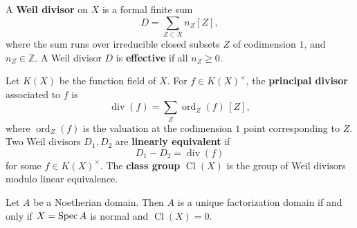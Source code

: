 \documentclass[12pt]{article}
\begin{document}
\begin{definition}
    A \textbf{Weil divisor} on $X$ is a formal finite sum
    \[
        D = \sum_{Z \subset X} n_Z [Z],
    \]
    where the sum runs over irreducible closed subsets $Z$ of codimension $1$, and $n_Z \in \mathbb Z$.
    A Weil divisor $D$ is \textbf{effective} if all $n_Z \ge 0$.
\end{definition}

\begin{definition}
    Let $K(X)$ be the function field of $X$. For $f \in K(X)^\times$, the \textbf{principal divisor} associated to $f$ is
    \[
        \operatorname{div}(f) = \sum_Z \operatorname{ord}_Z(f)\,[Z],
    \]
    where $\operatorname{ord}_Z(f)$ is the valuation at the codimension $1$ point corresponding to $Z$. Two Weil divisors $D_1, D_2$ are \textbf{linearly equivalent} if
    \[
        D_1 - D_2 = \operatorname{div}(f)
    \]
    for some $f \in K(X)^\times$.
    The \textbf{class group} $\operatorname{Cl}(X)$ is the group of Weil divisors modulo linear equivalence.
\end{definition}


\begin{proposition}
    Let $A$ be a Noetherian domain. Then $A$ is a unique factorization domain if and only if $X=\operatorname{Spec} A$ is normal and $\operatorname{Cl}(X)=0$.
\end{proposition}
\end{document}
